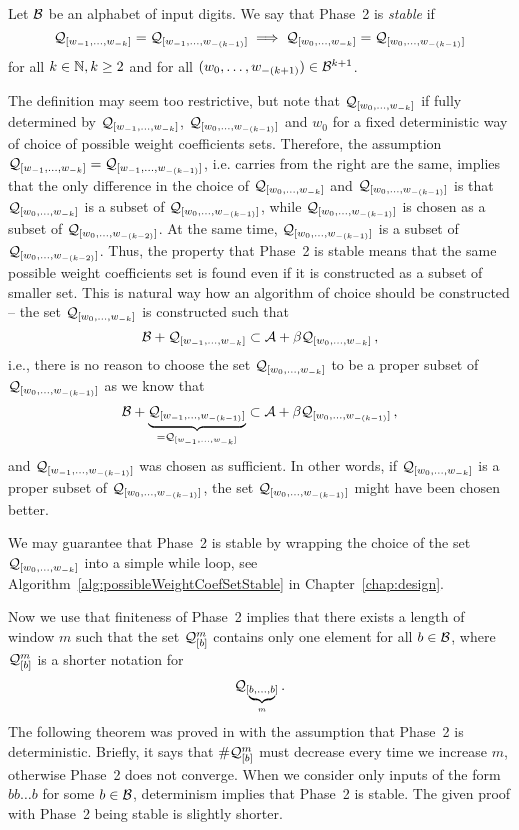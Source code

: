 \begin{defn}
Let $\mathcal{B}$ be an alphabet of input digits. We say that Phase~2 is \emph{stable} if 
$$
\mathcal{Q}_{[w_{-1}, \dots, w_{-k}]}=\mathcal{Q}_{[w_{-1}, \dots, w_{-(k-1)}]} \implies \mathcal{Q}_{[w_{0}, \dots, w_{-k}]}=\mathcal{Q}_{[w_{0}, \dots, w_{-(k-1)}]}
$$
for all $k\in\mathbb{N}, k\geq 2$ and for all $(w_{0}, \dots, w_{-(k+1)}) \in \mathcal{B}^{k+1}$.

\end{defn}
The definition may seem too restrictive, but note that $\mathcal{Q}_{[w_{0}, \dots, w_{-k}]}$ if fully determined by $\mathcal{Q}_{[w_{-1}, \dots, w_{-k}]}$, $\mathcal{Q}_{[w_{0}, \dots, w_{-(k-1)}]}$ and $w_0$ for a fixed deterministic way of choice of possible weight coefficients sets. Therefore, the assumption $\mathcal{Q}_{[w_{-1}, \dots, w_{-k}]}=\mathcal{Q}_{[w_{-1}, \dots, w_{-(k-1)}]}$, i.e. carries from the right are the same, implies that the only difference in the choice of $\mathcal{Q}_{[w_{0}, \dots, w_{-k}]}$ and $\mathcal{Q}_{[w_{0}, \dots, w_{-(k-1)}]}$ is that $\mathcal{Q}_{[w_{0}, \dots, w_{-k}]}$ is a subset of  $\mathcal{Q}_{[w_{0}, \dots, w_{-(k-1)}]}$, while $\mathcal{Q}_{[w_{0}, \dots, w_{-(k-1)}]}$ is chosen as a subset of $\mathcal{Q}_{[w_{0}, \dots, w_{-(k-2)}]}$. At the same time, $\mathcal{Q}_{[w_{0}, \dots, w_{-(k-1)}]}$ is a subset of $\mathcal{Q}_{[w_{0}, \dots, w_{-(k-2)}]}$. Thus, the property that Phase~2 is stable means that the same possible weight coefficients set is found even if it is constructed as a subset of smaller set. This is natural way how an algorithm of choice should be constructed -- the set $\mathcal{Q}_{[w_{0}, \dots, w_{-k}]}$ is constructed such that
$$
\mathcal{B}+\mathcal{Q}_{[w_{-1}, \dots, w_{-k}]} \subset \mathcal{A}+\beta \mathcal{Q}_{[w_{0}, \dots, w_{-k}]}\,,
$$
i.e., there is no reason to choose the set $\mathcal{Q}_{[w_{0}, \dots, w_{-k}]}$ to be a proper subset of $\mathcal{Q}_{[w_{0}, \dots, w_{-(k-1)}]}$ as we know that
$$
\mathcal{B}+\underbrace{\mathcal{Q}_{[w_{-1}, \dots, w_{-(k-1)}]}}_{=\mathcal{Q}_{[w_{-1}, \dots, w_{-k}]}} \subset \mathcal{A}+\beta \mathcal{Q}_{[w_{0}, \dots, w_{-(k-1)}]}\,,
$$
and $\mathcal{Q}_{[w_{-1}, \dots, w_{-(k-1)}]}$ was chosen as sufficient.
In other words, if $\mathcal{Q}_{[w_{0}, \dots, w_{-k}]}$ is a proper subset of $\mathcal{Q}_{[w_{0}, \dots, w_{-(k-1)}]}$, the set $\mathcal{Q}_{[w_{0}, \dots, w_{-(k-1)}]}$ might have been chosen better. 

We may guarantee that Phase~2 is stable by wrapping the choice of the set $\mathcal{Q}_{[w_{0}, \dots, w_{-k}]}$ into a simple while loop, see Algorithm~\ref{alg:possibleWeightCoefSetStable} in Chapter~\ref{chap:design}.

Now we use that finiteness of Phase~2 implies that there exists a length of window $m$ such that the set $\mathcal{Q}_{[\scriptstyle b]}^{\scriptstyle m}$ contains only one element for all $b\in\mathcal{B}$, where $\mathcal{Q}_{[\scriptstyle b]}^{\scriptstyle m}$ is a shorter notation for
$$
\mathcal{Q}_{[\underbrace{\scriptstyle b,\dots,b}_m]}\,.
$$
The following theorem was proved in \cite{vu} with the assumption that Phase~2 is deterministic. Briefly, it says that $\#\mathcal{Q}_{[\scriptstyle b]}^{\scriptstyle m}$ must decrease every time we increase $m$, otherwise Phase~2 does not converge. When we consider only inputs of the form $bb\dots b$ for some $b\in\mathcal{B}$, determinism implies that Phase~2 is stable. The given proof with Phase~2 being stable is slightly shorter.

